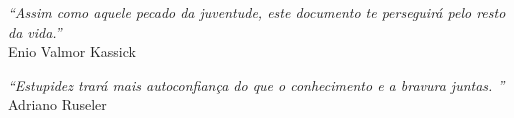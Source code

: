 


\begin{epigrafe}

\vspace*{\fill}\lang
{
}
{
    \begin{flushright}
        \textit{``Assim como aquele pecado da juventude, este documento te perseguirá pelo resto da vida.''} \\ Enio Valmor Kassick
    \end{flushright}
    \begin{flushright}
        \textit{``Estupidez trará mais autoconfiança do que o conhecimento e a bravura juntas. \englishword{\showfont}''} \\ Adriano Ruseler
    \end{flushright}
}

\end{epigrafe}


